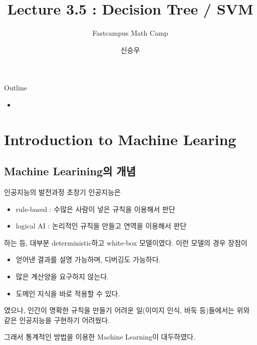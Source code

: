 \documentclass{beamer}
\title{Lecture 3.5 : Decision Tree / SVM }
\subtitle{Fastcampus Math Camp}
\author{신승우}
\begin{document}
\begin{frame}
  \titlepage
\end{frame}

\begin{frame}{Outline}
  \tableofcontents[hideallsubsections]
\end{frame}


\begin{frame}{}
\begin{itemize}{}
\item 
\end{itemize}

\end{frame}

\section{Introduction to Machine Learing} 

\subsection{Machine Learining의 개념} 



\begin{frame}[allowframebreaks]{인공지능의 발전과정}
초창기 인공지능은 
\begin{itemize} 
\item rule-based : 수많은 사람이 넣은 규칙을 이용해서 판단 
\item logical AI : 논리적인 규칙을 만들고 연역을 이용해서 판단 
\end{itemize}

하는 등, 대부분 deterministic하고 white-box 모델이였다. 이런 모델의 경우 장점이 

\begin{itemize} 
\item 얻어낸 결과를 설명 가능하며, 디버깅도 가능하다. 
\item 많은 계산양을 요구하지 않는다. 
\item 도메인 지식을 바로 적용할 수 있다. 
\end{itemize}

였으나, 인간이 명확한 규칙을 만들기 어려운 일(이미지 인식, 바둑 등)들에서는 위와 같은 인공지능을 구현하기 어려웠다. 

그래서 통계적인 방법을 이용한 Machine Learning이 대두하였다. 
\end{frame}
\end{document}
